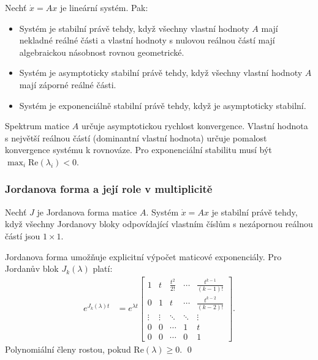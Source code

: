 \begin{theorem}
Nechť $\dot{x} = Ax$ je lineární systém. Pak:
\begin{itemize}
\item Systém je stabilní právě tehdy, když všechny vlastní hodnoty $A$ mají nekladné reálné části a vlastní hodnoty s nulovou reálnou částí mají algebraickou násobnost rovnou geometrické.
\item Systém je asymptoticky stabilní právě tehdy, když všechny vlastní hodnoty $A$ mají záporné reálné části.
\item Systém je exponenciálně stabilní právě tehdy, když je asymptoticky stabilní.
\end{itemize}
\end{theorem}

\begin{keyinsight}
Spektrum matice $A$ určuje asymptotickou rychlost konvergence. Vlastní hodnota s největší reálnou částí (dominantní vlastní hodnota) určuje pomalost konvergence systému k rovnováze. Pro exponenciální stabilitu musí být $\max_i \mathrm{Re}(\lambda_i) < 0$.
\end{keyinsight}

\subsubsection{Jordanova forma a její role v multiplicitě}

\begin{theorem}
Nechť $J$ je Jordanova forma matice $A$. Systém $\dot{x} = Ax$ je stabilní právě tehdy, když všechny Jordanovy bloky odpovídající vlastním číslům s nezápornou reálnou částí jsou $1 \times 1$.
\end{theorem}

\begin{proofsketch}
Jordanova forma umožňuje explicitní výpočet maticové exponenciály. Pro Jordanův blok $J_k(\lambda)$ platí:
\begin{align*}
e^{J_k(\lambda)t} &= e^{\lambda t} \begin{bmatrix}
1 & t & \frac{t^2}{2!} & \cdots & \frac{t^{k-1}}{(k-1)!} \\
0 & 1 & t & \cdots & \frac{t^{k-2}}{(k-2)!} \\
\vdots & \vdots & \ddots & \ddots & \vdots \\
0 & 0 & \cdots & 1 & t \\
0 & 0 & \cdots & 0 & 1
\end{bmatrix}.
\end{align*}
Polynomiální členy rostou, pokud $\mathrm{Re}(\lambda) \geq 0$. \qed
\end{proofsketch}

